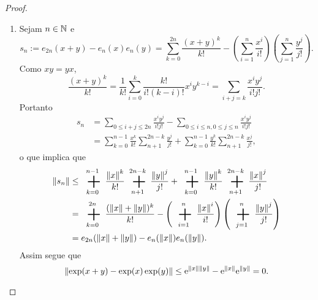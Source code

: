 \begin{proof}
\begin{enumerate}
	\item Sejam $n \in \mathbb{N}$ e
		\begin{equation*}
		s_n := e_{2n}(x+y) - e_n(x)e_n(y) = \sum_{k=0}^{2n} \frac{(x+y)^k}{k!} - \left( \sum_{i=1}^n \frac{x^i}{i!} \right)\left( \sum_{j=1}^n \frac{y^j}{j!} \right).
		\end{equation*}
Como $xy=yx$,
	\begin{equation*}
	\frac{(x+y)^k}{k!} = \frac{1}{k!} \sum_{i=0}^k \frac{k!}{i!(k-i)!}x^i y^{k-i} = \sum_{i+j=k} \frac{x^i y^j}{i!j!}.
	\end{equation*}
Portanto
	\begin{align*}
	s_n &= \sum_{0 \leq i+j \leq 2n} \frac{x^i y^j}{i!j!} - \sum_{0 \leq i \leq n, 0 \leq j \leq n} \frac{x^i y^j}{i!j!} \\
		&= \sum_{k=0}^{n-1} \frac{x^k}{k!} \sum_{n+1}^{2n-k} \frac{y^j}{j!} +  \sum_{k=0}^{n-1} \frac{y^k}{k!} \sum_{n+1}^{2n-k} \frac{x^j}{j!},
	\end{align*}
o que implica que
	\begin{align*}
	\nor{s_n} &\leq \sum_{k=0}^{n-1} \frac{\nor{x}^k}{k!} \sum_{n+1}^{2n-k} \frac{\nor{y}^j}{j!} +  \sum_{k=0}^{n-1} \frac{\nor{y}^k}{k!} \sum_{n+1}^{2n-k} \frac{\nor{x}^j}{j!} \\
		&= \sum_{k=0}^{2n} \frac{(\nor{x}+\nor{y})^k}{k!} - \left( \sum_{i=1}^n \frac{\nor{x}^i}{i!} \right)\left( \sum_{j=1}^n \frac{\nor{y}^j}{j!} \right) \\
		&= e_{2n}(\nor{x}+\nor{y}) - e_n(\nor{x})e_n(\nor{y}).
	\end{align*}
Assim segue que
	\begin{equation*}
	\left\Vert{\exp(x+y) - \exp(x)\exp(y)}\right\Vert \leq \mathrm{e}^{\left\Vert{x}\right\Vert\left\Vert{y}\right\Vert}-\mathrm{e}^{\left\Vert{x}\right\Vert}\mathrm{e}^{\left\Vert{y}\right\Vert} = 0.
	\end{equation*}

\begin{comment}
	\item Para todo $n \in \N$, como $xy=yx$,
	\begin{equation*}
	(x+y)^n = \sum_{i=0}^n \frac{n!}{i!(n-i)!}x^i y^{n-i} = n! \sum_{i+j=n} \frac{x^i}{i!}\frac{y^j}{j!}.
	\end{equation*}
Portanto
	\begin{align*}
	\exp(x+y) &= \sum_{n=0}^\infty \frac{(x+y)^n}{n!} \\
		&= \sum_{n=0}^\infty \sum_{i+j=n} \frac{x^i y^j}{i!j!} \\
		&= \left(\sum_{i=0}^\infty \frac{x^i}{i!} \right) \left(\sum_{i=0}^\infty \frac{y^j}{j!} \right) \\
		&= \exp(x) \exp(y).
	\end{align*}
\end{comment}


\end{enumerate}
\end{proof}
